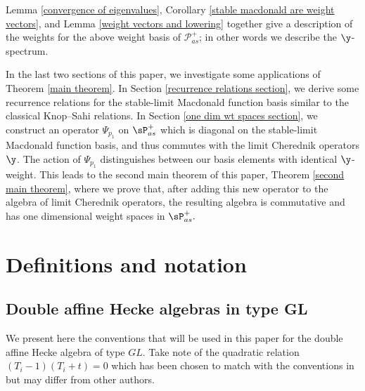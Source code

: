 Lemma \ref{convergence of eigenvalues}, Corollary \ref{stable macdonald are weight vectors}, and Lemma \ref{weight vectors and lowering} together give a description of the weights for the above weight basis of  $\mathscr{P}_{as}^{+}$; in other words we describe the $\y$-spectrum. 

In the last two sections of this paper, we investigate some applications of Theorem \ref{main theorem}. In 
Section \ref{recurrence relations section}, we derive some recurrence relations for the stable-limit Macdonald function basis similar to the classical Knop--Sahi relations. In Section \ref{one dim wt spaces section}, we construct an operator $\Psi_{p_1}$ on $\sP_{as}^{+}$ which is diagonal on the stable-limit Macdonald function basis, and thus commutes with the limit Cherednik operators $\y$. The action of $\Psi_{p_1}$  distinguishes between our basis elements with identical $\y$-weight. This leads to the second main theorem of this paper, Theorem \ref{second main theorem}, where we prove that, after adding this new operator to the algebra of limit Cherednik operators, the resulting algebra is commutative and has one dimensional weight spaces in $\sP_{as}^{+}.$

\section{Definitions and notation}\label{defn and notations}

\subsection{Double affine Hecke algebras in type GL}

We present here the conventions that will be used in this paper for the double affine Hecke algebra of type $GL$. Take note of the quadratic relation $(T_{i}-1)(T_{i}+t) = 0$ which has been chosen to match with the conventions in \cite{Ion_2022} but may differ from other authors.

